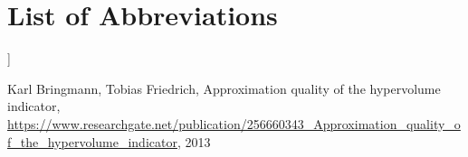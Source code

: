 \documentclass[oneside, notitlepage, twocolumn]{scrartcl}
\begin{document}
{\section{List of Abbreviations}
\begin{acronym}
\end{acronym}
}]

\begin{thebibliography}{1}
        Karl Bringmann, Tobias Friedrich, Approximation quality of the hypervolume indicator, \url{https://www.researchgate.net/publication/256660343_Approximation_quality_of_the_hypervolume_indicator}, 2013
\end{thebibliography}
\end{document}
